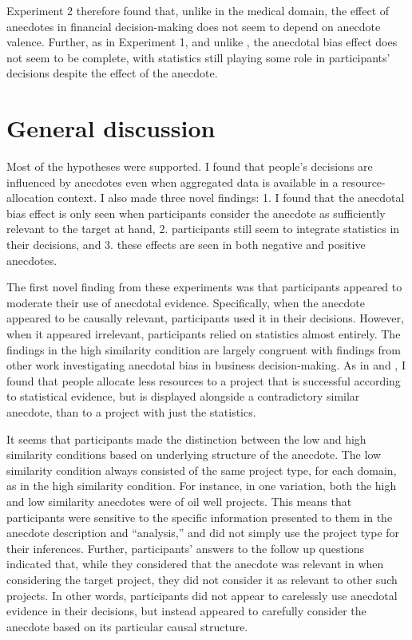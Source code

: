 \documentclass[a4paper, nobind, dvipsnames]{templates/ociamthesis}
\theoremstyle{definition}
\theoremstyle{definition}
\theoremstyle{definition}
\theoremstyle{definition}
\theoremstyle{remark}
\begin{document}
Experiment 2 therefore found that, unlike in the medical domain, the effect of
anecdotes in financial decision-making does not seem to depend on anecdote
valence. Further, as in Experiment 1, and unlike \textcite{wainberg2013}, the anecdotal
bias effect does not seem to be complete, with statistics still playing some
role in participants' decisions despite the effect of the anecdote.

\section{General discussion}

Most of the hypotheses were supported. I found that people's decisions are
influenced by anecdotes even when aggregated data is available in a
resource-allocation context. I also made three novel findings: 1. I found that
the anecdotal bias effect is only seen when participants consider the anecdote
as sufficiently relevant to the target at hand, 2. participants still seem to
integrate statistics in their decisions, and 3. these effects are seen in both
negative and positive anecdotes.

The first novel finding from these experiments was that participants appeared to
moderate their use of anecdotal evidence. Specifically, when the anecdote
appeared to be causally relevant, participants used it in their decisions.
However, when it appeared irrelevant, participants relied on statistics almost
entirely. The findings in the high similarity condition are largely congruent
with findings from other work investigating anecdotal bias in business
decision-making. As in \textcite{wainberg2013} and \textcite{wainberg2018}, I found that people
allocate less resources to a project that is successful according to statistical
evidence, but is displayed alongside a contradictory similar anecdote, than to a
project with just the statistics.

It seems that participants made the distinction between the low and high
similarity conditions based on underlying structure of the anecdote. The low
similarity condition always consisted of the same project type, for each domain,
as in the high similarity condition. For instance, in one variation, both the
high and low similarity anecdotes were of oil well projects. This means that
participants were sensitive to the specific information presented to them in the
anecdote description and ``analysis,'' and did not simply use the project type for
their inferences. Further, participants' answers to the follow up questions
indicated that, while they considered that the anecdote was relevant in when
considering the target project, they did not consider it as relevant to other
such projects. In other words, participants did not appear to carelessly use
anecdotal evidence in their decisions, but instead appeared to carefully
consider the anecdote based on its particular causal structure.
\end{document}
